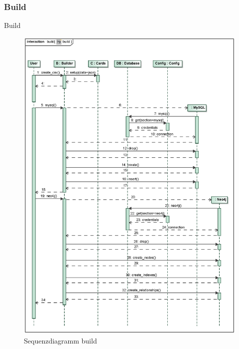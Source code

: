 \subsubsection{Build} %
Build \cite{mtgtop8} %

\begin{figure}[H]
    \myfloatalign
    \includegraphics[width=\textwidth]{gfx/MtGDeepAnalysis/build.eps}
    \caption{Sequenzdiagramm build} %
    \label{fig:seq:build}
\end{figure}